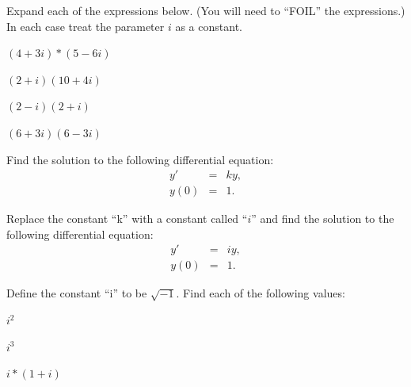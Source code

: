 

\begin{problem}
\item Expand each of the expressions below. (You will need to ``FOIL''
  the expressions.) In each case treat the parameter $i$ as a
  constant.

  \begin{subproblem}
  \item $(4+3i)*(5-6i)$
    \vfill

  \item $(2+i)(10+4i)$
    \vfill
      
  \item $(2-i)(2+i)$
    \vfill

  \item $(6+3i)(6-3i)$
    \vfill

  \end{subproblem}
\end{problem}



  \begin{problem}
  \item Find the solution to the following differential equation:
    \begin{eqnarray*}
      y' & = & k y, \\
      y(0) & = & 1.
    \end{eqnarray*}
    \vfill

  \item Replace the constant ``k'' with a constant called ``$i$'' and
    find the solution to the following differential equation:
    \begin{eqnarray*}
      y' & = & i y, \\
      y(0) & = & 1.
    \end{eqnarray*}
    \vfill


    \clearpage
  \item Define the constant ``i'' to be $\sqrt{-1}$. Find each of the
    following values:

    \begin{subproblem}
      \item $i^2$
        \vfill
      \item $i^3$
        \vfill
      \item $i*(1+i)$
        \vfill
    \end{subproblem}

  \end{problem}


